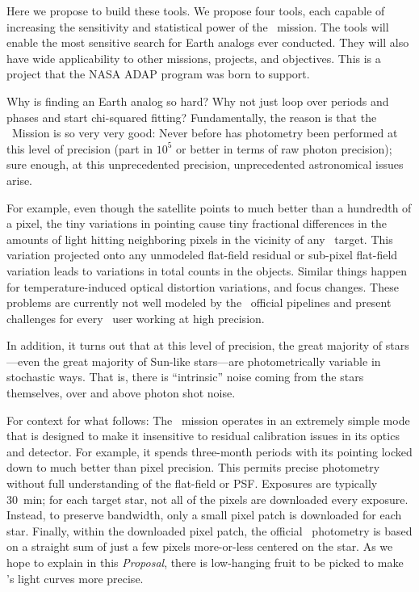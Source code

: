 \documentclass[letterpaper,12pt,preprint]{hack_aastex}
\newcommand{\documentname}{\textsl{Proposal}}
\begin{document}
Here we propose to build these tools.
We propose four tools, each capable of increasing the sensitivity and
statistical power of the \Kepler\ mission.
The tools will enable the most sensitive search for Earth analogs ever
conducted.
They will also have wide applicability to other missions, projects, and
objectives.
This is a project that the NASA ADAP program was born to support.

Why is finding an Earth analog so hard?
Why not just loop over periods and phases and start chi-squared fitting?
Fundamentally, the reason is that the \Kepler\ Mission is so very very good:
Never before has photometry been performed at this level of precision (part
in $10^{5}$ or better in terms of raw photon precision);
sure enough, at this unprecedented precision, unprecedented astronomical
issues arise.

For example, even though the satellite points to much better than a hundredth
of a pixel, the tiny variations in pointing cause tiny fractional differences
in the amounts of light hitting neighboring pixels in the vicinity of any
\Kepler\ target.
This variation projected onto any unmodeled flat-field residual or sub-pixel
flat-field variation leads to variations in total counts in the objects.
Similar things happen for temperature-induced optical distortion variations,
and focus changes.
These problems are currently not well modeled by the \Kepler\ official pipelines
and present challenges for every \Kepler\ user working at high precision.

In addition, it turns out that at this level of precision, the great majority
of stars---even the great majority of Sun-like stars---are photometrically
variable in stochastic ways.
That is, there is ``intrinsic'' noise coming from the stars themselves,
over and above photon shot noise.

For context for what follows:
The \Kepler\ mission operates in an extremely simple mode that is designed to
make it insensitive to residual calibration issues in its optics and detector.
For example, it spends three-month periods with its pointing locked down to
much better than pixel precision.
This permits precise photometry without full understanding of the flat-field
or PSF.
Exposures are typically 30~min;
for each target star, not all of the pixels are downloaded every exposure.
Instead, to preserve bandwidth, only a small pixel patch is downloaded for each
star.
Finally, within the downloaded pixel patch, the official \Kepler\ photometry
is based on a straight sum of just a few pixels more-or-less centered on the
star.
As we hope to explain in this \documentname, there is low-hanging fruit to be
picked to make \Kepler's light curves more precise.
\end{document}
